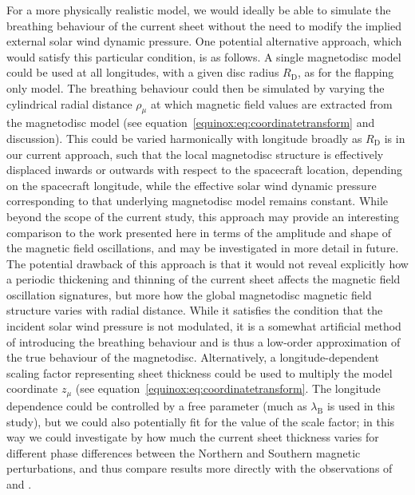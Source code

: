 For a more physically realistic model, we would ideally be able to simulate the breathing behaviour of the current sheet without the need to modify the implied external solar wind dynamic pressure. One potential alternative approach, which would satisfy this particular condition, is as follows. A single magnetodisc model could be used at all longitudes, with a given disc radius $R_\mathrm{D}$, as for the flapping only model. The breathing behaviour could then be simulated by varying the cylindrical radial distance $\rho_\mu$ at which magnetic field values are extracted from the magnetodisc model (see equation~\ref{equinox:eq:coordinatetransform} and discussion). This could be varied harmonically with longitude broadly as $R_\mathrm{D}$ is in our current approach, such that the local magnetodisc structure is effectively displaced inwards or outwards with respect to the spacecraft location, depending on the spacecraft longitude, while the effective solar wind dynamic pressure corresponding to that underlying magnetodisc model remains constant. While beyond the scope of the current study, this approach may provide an interesting comparison to the work presented here in terms of the amplitude and shape of the magnetic field oscillations, and may be investigated in more detail in future. The potential drawback of this approach is that it would not reveal explicitly how a periodic thickening and thinning of the current sheet affects the magnetic field oscillation signatures, but more how the global magnetodisc magnetic field structure varies with radial distance. While it satisfies the condition that the incident solar wind pressure is not modulated, it is a somewhat artificial method of introducing the breathing behaviour and is thus a low-order approximation of the true behaviour of the magnetodisc. Alternatively, a longitude-dependent scaling factor representing sheet thickness could be used to multiply the model coordinate $z_\mu$ (see equation~\ref{equinox:eq:coordinatetransform}. The longitude dependence could be controlled by a free parameter (much as $\lambda_\mathrm{B}$ is used in this study), but we could also potentially fit for the value of the scale factor; in this way we could investigate by how much the current sheet thickness varies for different phase differences between the Northern and Southern magnetic perturbations, and thus compare results more directly with the observations of \citep{provan2012} and \citep{cowley2017b}.
